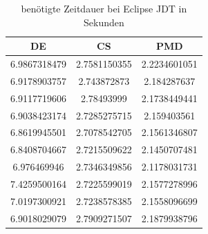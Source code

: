 \begin{appendices}
\begin{table}[]
    \centering
    \begin{tabular}{c|c|c}
DE & CS &PMD\\\hline
6.9867318479&2.7581150355&2.2234601051 \\\hline
6.9178903757&2.743872873&2.184287637 \\\hline
6.9117719606&2.78493999&2.1738449441 \\\hline
6.9038423174&2.7285275715&2.159403561 \\\hline
6.8619945501&2.7078542705&2.1561346807 \\\hline
6.8408704667&2.7215509622&2.1450707481 \\\hline
6.976469946&2.7346349856&2.1178031731 \\\hline
7.4259500164&2.7225599019&2.1577278996 \\\hline
7.0197300921&2.7238578385&2.1558096699 \\\hline
6.9018029079&2.7909271507&2.1879938796 \\\hline 
    \end{tabular}
    \caption{benötigte Zeitdauer bei Eclipse JDT in Sekunden}
    \label{tab:raw_eclipse}
\end{table}
\end{appendices}
	
